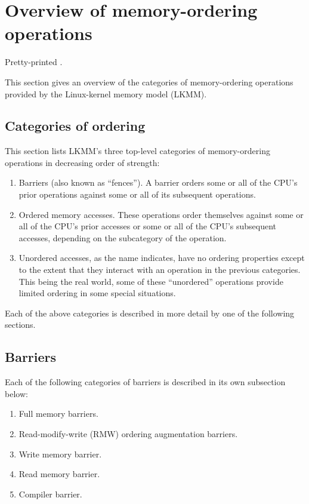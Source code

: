 \section{Overview of memory-ordering operations}
\label{sec:docs:Overview of memory-ordering operations}

\begin{Note}
  Pretty-printed .
\end{Note}

This section gives an overview of the categories of memory-ordering
operations provided by the Linux-kernel memory model (LKMM).


\subsection{Categories of ordering}

This section lists LKMM's three top-level categories of memory-ordering
operations in decreasing order of strength:

\begin{enumerate}
 \item	Barriers (also known as ``fences'').
	A barrier orders some or all of the CPU's prior operations
	against some or all of its subsequent operations.

 \item	Ordered memory accesses.
	These operations order themselves against some or all of
	the CPU's prior accesses or some or all	of the CPU's subsequent
	accesses, depending on the subcategory of the operation.

 \item	Unordered accesses, as the name indicates, have no ordering
	properties except to the extent that they interact with an
	operation in the previous categories.
	This being the real world, some of these ``unordered''
	operations provide limited ordering in some special situations.
\end{enumerate}

Each of the above categories is described in more detail by one of the
following sections.


\subsection{Barriers}

Each of the following categories of barriers is described in its own
subsection below:

\begin{enumerate}
 \item	Full memory barriers.

 \item	Read-modify-write (RMW) ordering augmentation barriers.

 \item	Write memory barrier.

 \item	Read memory barrier.

 \item	Compiler barrier.
\end{enumerate}

